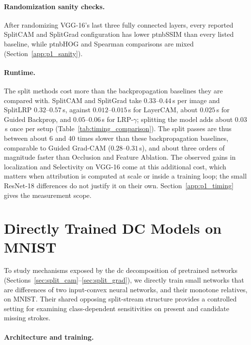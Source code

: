 \paragraph{Randomization sanity checks.}
After randomizing VGG-16's last three fully connected layers, every reported SplitCAM and SplitGrad configuration has lower \ac{ptnbSSIM} than every listed baseline, while \ac{ptnbHOG} and Spearman comparisons are mixed (Section~\ref{app:p1_sanity}).

\paragraph{Runtime.}
The split methods cost more than the backpropagation baselines they are compared with. SplitCAM and SplitGrad take $0.33$--$0.44$\,s per image and SplitLRP $0.32$--$0.57$\,s, against $0.012$--$0.015$\,s for LayerCAM, about $0.025$\,s for Guided Backprop, and $0.05$--$0.06$\,s for LRP-$\gamma$; splitting the model adds about $0.03$\,s once per setup (Table~\ref{tab:timing_comparison}). The split passes are thus between about 6 and 40 times slower than these backpropagation baselines, comparable to Guided Grad-CAM ($0.28$--$0.31$\,s), and about three orders of magnitude faster than Occlusion and Feature Ablation. The observed gains in localization and Selectivity on VGG-16 come at this additional cost, which matters when attribution is computed at scale or inside a training loop; the small ResNet-18 differences do not justify it on their own. Section~\ref{app:p1_timing} gives the measurement scope.



\section{Directly Trained DC Models on MNIST}\label{sec:dcinns}

To study mechanisms exposed by the \ac{dc} decomposition of pretrained networks (Sections~\ref{sec:split_cam}--\ref{sec:split_grad}), we directly train small networks that are differences of two input-convex neural networks, and their monotone relatives, on MNIST. Their shared opposing split-stream structure provides a controlled setting for examining class-dependent sensitivities on present and candidate missing strokes.

\paragraph{Architecture and training.}\label{subsec:dcinn_architecture}

